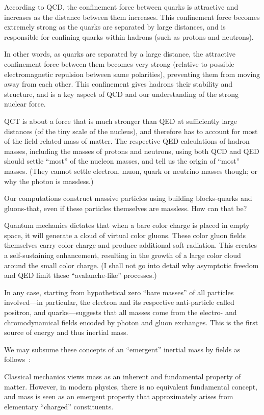 According to QCD, the confinement force between quarks is attractive and increases as the distance between them increases.
This confinement force becomes extremely strong as the quarks are separated by large distances,
and is responsible for confining quarks within hadrons (such as protons and neutrons).

In other words, as quarks are separated by a large distance,
the attractive confinement force between them becomes very strong
(relative to possible electromagnetic repulsion between same polarities),
preventing them from moving away from each other.
This confinement gives hadrons their stability and structure,
and is a key aspect of QCD and our understanding of the strong nuclear force.

QCT is about a force that is much stronger than QED at sufficiently large distances (of the tiny scale of the nucleus),
and therefore has to account for most of the field-related mass of matter.
The respective QED calculations of hadron masses,
including the masses of protons and neutrons, using both QCD and QED should settle ``most'' of the nucleon masses, and
 tell us the origin of ``most'' masses.
(They cannot settle electron, muon, quark or neutrino masses though; or why the photon is massless.)

Our computations construct massive particles using building blocks-quarks
and gluons-that, even if these particles themselves are massless.
How can that be?

Quantum mechanics dictates that when a bare color charge is placed in empty space,
it will generate a cloud of virtual color gluons.
These color gluon fields themselves carry color charge and produce additional soft radiation.
This creates a self-sustaining enhancement, resulting in the growth of a large color cloud around the small color charge.
(I shall not go into detail why asymptotic freedom and QED limit these ``avalanche-like'' processes.)

In any case, starting from hypothetical zero ``bare masses'' of all particles involved---in particular, the electron and its respective anti-particle
called positron, and quarks---suggests that all masses come from the electro- and chromodynamical fields encoded by photon and gluon exchanges.
This is the first source of energy and thus inertial mass.

We may subsume these concepts of an ``emergent'' inertial mass by fields as follows~\cite{Wilczek_2012}:

Classical mechanics views mass as an inherent and fundamental property of matter. However, in modern physics, there is no equivalent fundamental concept, and mass is seen as an emergent property
that approximately arises from elementary ``charged'' constituents.

